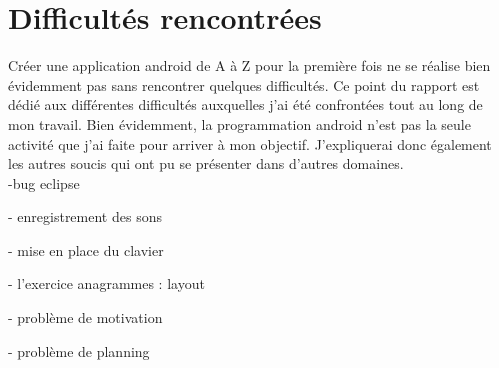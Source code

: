 \section{Difficultés rencontrées}
Créer une application android de A à Z pour la première fois ne se réalise bien évidemment pas sans rencontrer quelques difficultés. Ce point du rapport est dédié aux différentes difficultés auxquelles j'ai été confrontées tout au long de mon travail. Bien évidemment, la programmation android n'est pas la seule activité que j'ai faite pour arriver à mon objectif. J'expliquerai donc également les autres soucis qui ont pu se présenter dans d'autres domaines.\\

-bug eclipse

- enregistrement des sons

- mise en place du clavier

- l'exercice anagrammes : layout

- problème de motivation

- problème de planning